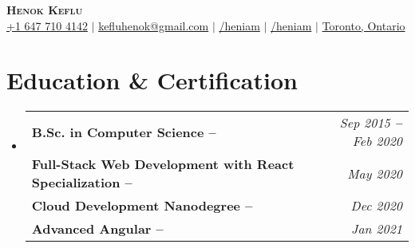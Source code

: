 \documentclass[letterpaper,11pt]{article}
\makeatletter
\newcommand{\resumeEducationHeading}[8]{
  \vspace{2pt}\item
    \begin{tabular*}{0.97\textwidth}[t]{l@{\extracolsep{\fill}}r}
      \vspace{8pt}
      \textbf{#1} & \textit{#2} \\
       \vspace{3pt}
      \textbf{#3} & \textit{#4} \\
       \vspace{3pt}
      \textbf{#5} & \textit{#6} \\
       \vspace{3pt}
      \textbf{#7} & \textit{#8} \\
    \end{tabular*}\vspace{-5pt}
}
\newcommand{\resumeSubHeadingListStart}{\begin{itemize}[leftmargin=0.15in, label={}]}
\newcommand{\resumeSubHeadingListEnd}{\end{itemize}}
\makeatother
\begin{document}

\begin{center}
    \textbf{\Huge \scshape Henok Keflu} \\ \vspace{3pt}
    \small
    \faMobile \hspace{.5pt} \href{tel:905314204536}{+1 647 710 4142}
    $|$
    \faAt \hspace{.5pt} \href{mailto:kefluhenok@gmail.com}{kefluhenok@gmail.com}
    $|$
    \faLinkedinSquare \hspace{.5pt} \href{https://www.linkedin.com/in/heniam}{/heniam}
    $|$
    \faGithub \hspace{.5pt} \href{https://github.com/heniam}{/heniam}
    $|$
    \faMapMarker \hspace{.5pt} \href{https://www.google.com/maps?cid=15832573594118352153}{Toronto, Ontario }
\end{center}




\section{Education \& Certification }
  \vspace{3pt}
  \resumeSubHeadingListStart
    \resumeEducationHeading
      {B.Sc. in Computer Science \textbf{--} \normalfont{\textit {York University} }
      } 
      {Sep 2015 \textbf{--} Feb 2020}
      {Full-Stack Web Development with React Specialization \textbf{--} \normalfont{\textit {Coursera} }
      } {May 2020}
      {Cloud Development Nanodegree \textbf{--} 
      \normalfont{\textit {Udacity}
      }}{Dec 2020}  
      {Advanced Angular  \textbf{--} \normalfont{\textit {Angular Academy}
      }} {Jan 2021}
  \resumeSubHeadingListEnd



\end{document}
